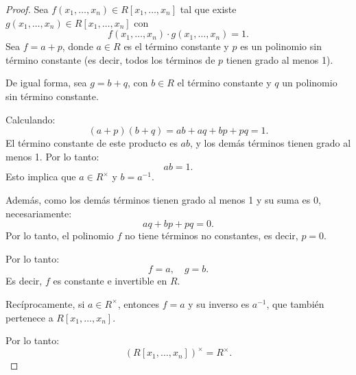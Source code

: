 \begin{ejemplo}
\end{ejemplo}

\begin{proof}
	Sea \( f(x_1, \dots, x_n) \in R[x_1, \dots, x_n] \) tal que existe \( g(x_1, \dots, x_n) \in R[x_1, \dots, x_n] \) con
	\[
	f(x_1, \dots, x_n) \cdot g(x_1, \dots, x_n) = 1.
	\]
	Sea \( f = a + p \), donde \( a \in R \) es el término constante y \( p \) es un polinomio sin término constante (es decir, todos los términos de \( p \) tienen grado al menos 1).
	
	De igual forma, sea \( g = b + q \), con \( b \in R \) el término constante y \( q \) un polinomio sin término constante.
	
	Calculando:
	\[
	(a + p)(b + q) = ab + aq + bp + pq = 1.
	\]
	El término constante de este producto es \( ab \), y los demás términos tienen grado al menos 1. Por lo tanto:
	\[
	ab = 1.
	\]
	Esto implica que \( a \in R^\times \) y \( b = a^{-1} \).
	
	Además, como los demás términos tienen grado al menos 1 y su suma es 0, necesariamente:
	\[
	aq + bp + pq = 0.
	\]
	Por lo tanto, el polinomio \( f \) no tiene términos no constantes, es decir, \( p = 0 \).
	
	Por lo tanto:
	\[
	f = a, \quad g = b.
	\]
	Es decir, \( f \) es constante e invertible en \( R \).
	
	Recíprocamente, si \( a \in R^\times \), entonces \( f = a \) y su inverso es \( a^{-1} \), que también pertenece a \( R[x_1, \dots, x_n] \).
	
	Por lo tanto:
	\[
	\left( R[x_1, \dots, x_n] \right)^\times = R^\times.
	\]
\end{proof}


